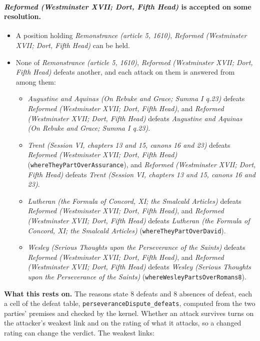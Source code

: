 \documentclass[11pt]{article}
\begin{document}
\paragraph{\emph{Reformed (Westminster XVII; Dort, Fifth Head)} is accepted on some resolution.}
\begin{itemize}
\item A position holding \emph{Remonstrance (article 5, 1610)}, \emph{Reformed (Westminster XVII; Dort, Fifth Head)} can be held.
\item None of \emph{Remonstrance (article 5, 1610)}, \emph{Reformed (Westminster XVII; Dort, Fifth Head)} defeats another, and each attack on them is answered from among them:
\begin{itemize}
\item \emph{Augustine and Aquinas (On Rebuke and Grace; Summa I q.23)} defeats \emph{Reformed (Westminster XVII; Dort, Fifth Head)}, and \emph{Reformed (Westminster XVII; Dort, Fifth Head)} defeats \emph{Augustine and Aquinas (On Rebuke and Grace; Summa I q.23)}.
\item \emph{Trent (Session VI, chapters 13 and 15, canons 16 and 23)} defeats \emph{Reformed (Westminster XVII; Dort, Fifth Head)} (\texttt{where\allowbreak{}They\allowbreak{}Part\allowbreak{}Over\allowbreak{}Assurance}), and \emph{Reformed (Westminster XVII; Dort, Fifth Head)} defeats \emph{Trent (Session VI, chapters 13 and 15, canons 16 and 23)}.
\item \emph{Lutheran (the Formula of Concord, XI; the Smalcald Articles)} defeats \emph{Reformed (Westminster XVII; Dort, Fifth Head)}, and \emph{Reformed (Westminster XVII; Dort, Fifth Head)} defeats \emph{Lutheran (the Formula of Concord, XI; the Smalcald Articles)} (\texttt{where\allowbreak{}They\allowbreak{}Part\allowbreak{}Over\allowbreak{}David}).
\item \emph{Wesley (Serious Thoughts upon the Perseverance of the Saints)} defeats \emph{Reformed (Westminster XVII; Dort, Fifth Head)}, and \emph{Reformed (Westminster XVII; Dort, Fifth Head)} defeats \emph{Wesley (Serious Thoughts upon the Perseverance of the Saints)} (\texttt{where\allowbreak{}Wesley\allowbreak{}Parts\allowbreak{}Over\allowbreak{}Romans8}).
\end{itemize}
\end{itemize}
\par\noindent\textbf{What this rests on.} The reasons state 8 defeats and 8 absences of defeat, each a cell of the defeat table, \texttt{perseverance\allowbreak{}Dispute\_\allowbreak{}defeats}, computed from the two parties' premises and checked by the kernel. Whether an attack survives turns on the attacker's weakest link and on the rating of what it attacks, so a changed rating can change the verdict. The weakest links:
\end{document}

